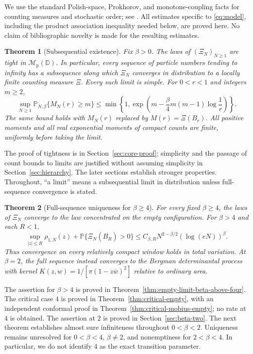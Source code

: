 \documentclass[11pt,a4paper]{article}
\numberwithin{equation}{section}
\newtheorem{theorem}{Theorem}[section]
\theoremstyle{definition}
\theoremstyle{remark}
\newcommand{\D}{\mathbb D}
\newcommand{\Pbb}{\mathbb P}
\newcommand{\Mp}{\mathcal M_{\mathrm p}}
\begin{document}
We use the standard Polish-space, Prokhorov, and monotone-coupling facts for
counting measures and stochastic order; see \cite{Kallenberg,Strassen}.
All estimates specific to \eqref{eq:model}, including the product association
inequality needed below, are proved here. No claim of bibliographic novelty
is made for the resulting estimates.

\begin{theorem}[Subsequential existence]\label{thm:core}
Fix $\beta>0$. The laws of $(\Xi_N)_{N\ge1}$ are tight in $\Mp(\D)$.
In particular, every sequence of particle numbers tending to infinity has
a subsequence along which $\Xi_N$ converges in distribution to a locally
finite counting measure $\Xi$. Every such limit is simple.
For $0<r<1$ and integers $m\ge2$,
\begin{equation}\label{eq:gaussian-tail}
 \sup_{N\ge1}\Pbb_{N,\beta}\{M_N(r)\ge m\}
 \le \min\left\{1,
  \exp\left(m-\frac{\beta}{4}m(m-1)\log\frac1r\right)\right\}.
\end{equation}
The same bound holds with $M_N(r)$ replaced by $M(r)=\Xi(B_r)$.
All positive moments and all real exponential moments of compact counts
are finite, uniformly before taking the limit.
\end{theorem}

The proof of tightness is in Section~\ref{sec:core-proof}; simplicity and
the passage of count bounds to limits are justified without assuming
simplicity in Section~\ref{sec:hierarchy}. The later sections establish
stronger properties. Throughout, ``a limit'' means a subsequential limit
in distribution unless full-sequence convergence is stated.

\begin{theorem}[Full-sequence uniqueness for $\beta\ge4$]\label{thm:front-uniqueness}
For every fixed $\beta\ge4$, the laws of $\Xi_N$ converge to the law
concentrated on the empty configuration. For $\beta>4$ and each $R<1$,
\[
 \sup_{|z|\le R}\rho_{1,N}(z)
 +\mathbb P\{\Xi_N(\overline{B_R})>0\}
 \le C_{\beta,R}N^{2-\beta/2}(\log(eN))^\beta.
\]
Thus convergence on every relatively compact window holds in total
variation. At $\beta=2$, the full sequence instead converges to the
Bergman determinantal process with kernel
$K(z,w)=1/[\pi(1-z\overline w)^2]$ relative to ordinary area.
\end{theorem}

The assertion for $\beta>4$ is proved in
Theorem~\ref{thm:empty-limit-beta-above-four}. The critical case $4$
is proved in Theorem~\ref{thm:critical-empty}, with an independent
conformal proof in Theorem~\ref{thm:critical-mobius-empty}; no rate
at $4$ is obtained. The assertion at $2$ is proved in
Section~\ref{sec:beta-two}. The next theorem establishes almost sure
infiniteness throughout $0<\beta<2$. Uniqueness remains unresolved
for $0<\beta<4$, $\beta\ne2$, and nonemptiness for $2<\beta<4$.
In particular, we do not identify $4$ as the exact transition parameter.
\end{document}
